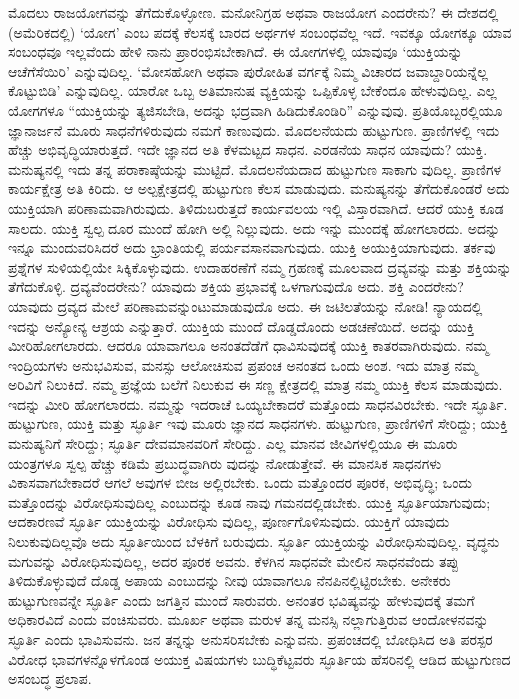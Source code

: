 ಮೊದಲು ರಾಜಯೋಗವನ್ನು ತೆಗೆದುಕೊಳ್ಳೋಣ. ಮನೋನಿಗ್ರಹ ಅಥವಾ ರಾಜಯೋಗ ಎಂದರೇನು? ಈ ದೇಶದಲ್ಲಿ (ಅಮೆರಿಕದಲ್ಲಿ) ‘ಯೋಗ’ ಎಂಬ ಪದಕ್ಕೆ ಕೆಲಸಕ್ಕೆ ಬಾರದ ಅರ್ಥಗಳ ಸಂಬಂಧವೆಲ್ಲ ಇದೆ. ಇವಕ್ಕೂ ಯೋಗಕ್ಕೂ ಯಾವ ಸಂಬಂಧವೂ ಇಲ್ಲವೆಂದು ಹೇಳಿ ನಾನು ಪ್ರಾರಂಭಿಸಬೇಕಾಗಿದೆ. ಈ ಯೋಗಗಳಲ್ಲಿ ಯಾವುವೂ ‘ಯುಕ್ತಿಯನ್ನು ಆಚೆಗೆಸೆಯಿರಿ’ ಎನ್ನುವುದಿಲ್ಲ. ‘ಮೋಸಹೋಗಿ ಅಥವಾ ಪುರೋಹಿತ ವರ್ಗಕ್ಕೆ ನಿಮ್ಮ ವಿಚಾರದ ಜವಾಬ್ದಾರಿಯನ್ನೆಲ್ಲ ಕೊಟ್ಟುಬಿಡಿ’ ಎನ್ನುವುದಿಲ್ಲ. ಯಾರೋ ಒಬ್ಬ ಅತಿಮಾನುಷ ವ್ಯಕ್ತಿಯನ್ನು ಒಪ್ಪಿಕೊಳ್ಳ ಬೇಕೆಂದೂ ಹೇಳುವುದಿಲ್ಲ. ಎಲ್ಲ ಯೋಗಗಳೂ “ಯುಕ್ತಿಯನ್ನು ತ್ಯಜಿಸಬೇಡಿ, ಅದನ್ನು ಭದ್ರವಾಗಿ ಹಿಡಿದುಕೊಂಡಿರಿ” ಎನ್ನುವುವು. ಪ್ರತಿಯೊಬ್ಬರಲ್ಲಿಯೂ ಜ್ಞಾನಾರ್ಜನೆ ಮೂರು ಸಾಧನೆಗಳಿರುವುದು ನಮಗೆ ಕಾಣುವುದು. ಮೊದಲನೆಯದು ಹುಟ್ಟುಗುಣ. ಪ್ರಾಣಿಗಳಲ್ಲಿ ಇದು ಹೆಚ್ಚು ಅಭಿವೃದ್ಧಿಯಾರುತ್ತದೆ. ಇದೇ ಜ್ಞಾನದ ಅತಿ ಕೆಳಮಟ್ಟದ ಸಾಧನ. ಎರಡನೆಯ ಸಾಧನ ಯಾವುದು? ಯುಕ್ತಿ. ಮನುಷ್ಯನಲ್ಲಿ ಇದು ತನ್ನ ಪರಾಕಾಷ್ಠೆಯನ್ನು ಮುಟ್ಟಿದೆ. ಮೊದಲನೆಯದಾದ ಹುಟ್ಟುಗುಣ ಸಾಕಾಗು ವುದಿಲ್ಲ. ಪ್ರಾಣಿಗಳ ಕಾರ್ಯಕ್ಷೇತ್ರ ಅತಿ ಕಿರಿದು. ಆ ಅಲ್ಪಕ್ಷೇತ್ರದಲ್ಲಿ ಹುಟ್ಟುಗುಣ ಕೆಲಸ ಮಾಡುವುದು. ಮನುಷ್ಯನನ್ನು ತೆಗೆದುಕೊಂಡರೆ ಅದು ಯುಕ್ತಿಯಾಗಿ ಪರಿಣಾಮವಾಗಿರುವುದು. ತಿಳಿದುಬರುತ್ತದೆ ಕಾರ್ಯವಲಯ ಇಲ್ಲಿ ವಿಸ್ತಾರವಾಗಿದೆ. ಆದರೆ ಯುಕ್ತಿ ಕೂಡ ಸಾಲದು. ಯುಕ್ತಿ ಸ್ವಲ್ಪ ದೂರ ಮುಂದೆ ಹೋಗಿ ಅಲ್ಲಿ ನಿಲ್ಲುವುದು. ಅದು ಇನ್ನು ಮುಂದಕ್ಕೆ ಹೋಗಲಾರದು. ಅದನ್ನು ಇನ್ನೂ ಮುಂದುವರಿಸಿದರೆ ಅದು ಭ್ರಾಂತಿಯಲ್ಲಿ ಪರ್ಯವಸಾನವಾಗುವುದು. ಯುಕ್ತಿ ಅಯುಕ್ತಿಯಾಗುವುದು. ತರ್ಕವು ಪ್ರಶ್ನೆಗಳ ಸುಳಿಯಲ್ಲಿಯೇ ಸಿಕ್ಕಿಕೊಳ್ಳುವುದು. ಉದಾಹರಣೆಗೆ ನಮ್ಮ ಗ್ರಹಣಕ್ಕೆ ಮೂಲವಾದ ದ್ರವ್ಯವನ್ನು ಮತ್ತು ಶಕ್ತಿಯನ್ನು ತೆಗೆದುಕೊಳ್ಳಿ. ದ್ರವ್ಯವೆಂದರೇನು? ಯಾವುದು ಶಕ್ತಿಯ ಪ್ರಭಾವಕ್ಕೆ ಒಳಗಾಗುವುದೊ ಅದು. ಶಕ್ತಿ ಎಂದರೇನು? ಯಾವುದು ದ್ರವ್ಯದ ಮೇಲೆ ಪರಿಣಾಮವನ್ನುಂಟುಮಾಡುವುದೊ ಅದು. ಈ ಜಟಿಲತೆಯನ್ನು ನೋಡಿ! ನ್ಯಾಯದಲ್ಲಿ ಇದನ್ನು ಅನ್ಯೋನ್ಯ ಆಶ್ರಯ ಎನ್ನುತ್ತಾರೆ. ಯುಕ್ತಿಯ ಮುಂದೆ ದೊಡ್ಡದೊಂದು ಅಡಚಣೆಯಿದೆ. ಅದನ್ನು ಯುಕ್ತಿ ಮೀರಿಹೋಗಲಾರದು. ಆದರೂ ಯಾವಾಗಲೂ ಅನಂತದೆಡೆಗೆ ಧಾವಿಸುವುದಕ್ಕೆ ಯುಕ್ತಿ ಕಾತರವಾಗಿರುವುದು. ನಮ್ಮ ಇಂದ್ರಿಯಗಳು ಅನುಭವಿಸುವ, ಮನಸ್ಸು ಆಲೋಚಿಸುವ ಪ್ರಪಂಚ ಅನಂತದ ಒಂದು ಅಂಶ. ಇದು ಮಾತ್ರ ನಮ್ಮ ಅರಿವಿಗೆ ನಿಲುಕಿದೆ. ನಮ್ಮ ಪ್ರಜ್ಞೆಯ ಬಲೆಗೆ ನಿಲುಕುವ ಈ ಸಣ್ಣ ಕ್ಷೇತ್ರದಲ್ಲಿ ಮಾತ್ರ ನಮ್ಮ ಯುಕ್ತಿ ಕೆಲಸ ಮಾಡುವುದು. ಇದನ್ನು ಮೀರಿ ಹೋಗಲಾರದು. ನಮ್ಮನ್ನು ಇದರಾಚೆ ಒಯ್ಯಬೇಕಾದರೆ ಮತ್ತೊಂದು ಸಾಧನವಿರಬೇಕು. ಇದೇ ಸ್ಫೂರ್ತಿ. ಹುಟ್ಟುಗುಣ, ಯುಕ್ತಿ ಮತ್ತು ಸ್ಫೂರ್ತಿ ಇವು ಮೂರು ಜ್ಞಾನದ ಸಾಧನಗಳು. ಹುಟ್ಟುಗುಣ, ಪ್ರಾಣಿಗಳಿಗೆ ಸೇರಿದ್ದು; ಯುಕ್ತಿ ಮನುಷ್ಯನಿಗೆ ಸೇರಿದ್ದು; ಸ್ಫೂರ್ತಿ ದೇವಮಾನವರಿಗೆ ಸೇರಿದ್ದು. ಎಲ್ಲ ಮಾನವ ಜೀವಿಗಳಲ್ಲಿಯೂ ಈ ಮೂರು ಯಂತ್ರಗಳೂ ಸ್ವಲ್ಪ ಹೆಚ್ಚು ಕಡಿಮೆ ಪ್ರಬುದ್ಧವಾಗಿರು ವುದನ್ನು ನೋಡುತ್ತೇವೆ. ಈ ಮಾನಸಿಕ ಸಾಧನಗಳು ವಿಕಾಸವಾಗಬೇಕಾದರೆ ಆಗಲೆ ಅವುಗಳ ಬೀಜ ಅಲ್ಲಿರಬೇಕು. ಒಂದು ಮತ್ತೊಂದರ ಪೂರಕ, ಅಭಿವೃದ್ಧಿ; ಒಂದು ಮತ್ತೊಂದನ್ನು ವಿರೋಧಿಸುವುದಿಲ್ಲ ಎಂಬುದನ್ನು ಕೂಡ ನಾವು ಗಮನದಲ್ಲಿಡಬೇಕು. ಯುಕ್ತಿ ಸ್ಫೂರ್ತಿಯಾಗುವುದು; ಆದಕಾರಣವೆ ಸ್ಫೂರ್ತಿ ಯುಕ್ತಿಯನ್ನು ವಿರೋಧಿಸು ವುದಿಲ್ಲ, ಪೂರ್ಣಗೊಳಿಸುವುದು. ಯುಕ್ತಿಗೆ ಯಾವುದು ನಿಲುಕುವುದಿಲ್ಲವೊ ಅದು ಸ್ಫೂರ್ತಿಯಿಂದ ಬೆಳಕಿಗೆ ಬರುವುದು. ಸ್ಫೂರ್ತಿ ಯುಕ್ತಿಯನ್ನು ವಿರೋಧಿಸುವುದಿಲ್ಲ. ವೃದ್ಧನು ಮಗುವನ್ನು ವಿರೋಧಿಸುವುದಿಲ್ಲ, ಅದರ ಪೂರಕ ಅವನು. ಕೆಳಗಿನ ಸಾಧನವೇ ಮೇಲಿನ ಸಾಧನವೆಂದು ತಪ್ಪು ತಿಳಿದುಕೊಳ್ಳುವುದೆ ದೊಡ್ಡ ಅಪಾಯ ಎಂಬುದನ್ನು ನೀವು ಯಾವಾಗಲೂ ನೆನಪಿನಲ್ಲಿಟ್ಟಿರಬೇಕು. ಅನೇಕರು ಹುಟ್ಟುಗುಣವನ್ನೇ ಸ್ಫೂರ್ತಿ ಎಂದು ಜಗತ್ತಿನ ಮುಂದೆ ಸಾರುವರು. ಅನಂತರ ಭವಿಷ್ಯವನ್ನು ಹೇಳುವುದಕ್ಕೆ ತಮಗೆ ಅಧಿಕಾರವಿದೆ ಎಂದು ವಂಚಿಸುವರು. ಮೂರ್ಖ ಅಥವಾ ಮರುಳ ತನ್ನ ಮನಸ್ಸಿ ನಲ್ಲಾಗುತ್ತಿರುವ ಆಂದೋಳನವನ್ನು ಸ್ಫೂರ್ತಿ ಎಂದು ಭಾವಿಸುವನು. ಜನ ತನ್ನನ್ನು ಅನುಸರಿಸಬೇಕು ಎನ್ನುವನು. ಪ್ರಪಂಚದಲ್ಲಿ ಬೋಧಿಸಿದ ಅತಿ ಪರಸ್ಪರ ವಿರೋಧ ಭಾವಗಳನ್ನೊಳಗೊಂಡ ಅಯುಕ್ತ ವಿಷಯಗಳು ಬುದ್ಧಿಕೆಟ್ಟವರು ಸ್ಫೂರ್ತಿಯ ಹೆಸರಿನಲ್ಲಿ ಆಡಿದ ಹುಟ್ಟುಗುಣದ ಅಸಂಬದ್ಧ ಪ್ರಲಾಪ.

